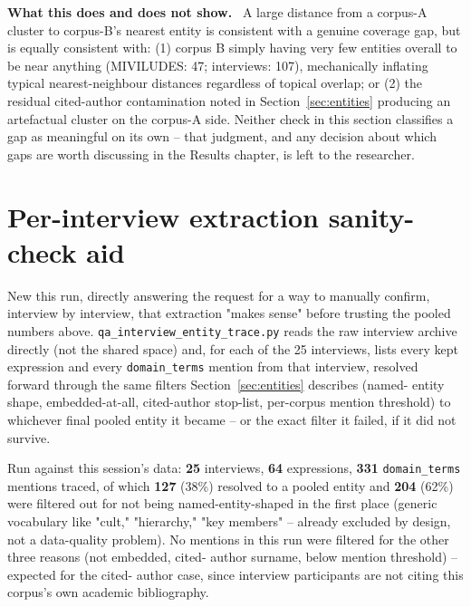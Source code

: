 \documentclass[11pt,a4paper]{article}
\newenvironment{plainbox}[1][Note]
  {\par\vspace{6pt}\noindent{\color{noteline}\rule{\linewidth}{0.6pt}}\par\vspace{3pt}
   \noindent\small\textbf{#1.}\ \ignorespaces}
  {\par\vspace{3pt}\noindent{\color{noteline}\rule{\linewidth}{0.6pt}}\vspace{6pt}\par}
\begin{document}
\begin{plainbox}[What this does and does not show]
A large distance from a corpus-A cluster to corpus-B's nearest entity is
consistent with a genuine coverage gap, but is equally consistent with:
(1) corpus B simply having very few entities overall to be near
anything (MIVILUDES: 47; interviews: 107), mechanically inflating
typical nearest-neighbour distances regardless of topical overlap; or
(2) the residual cited-author contamination noted in
Section~\ref{sec:entities} producing an artefactual cluster on the
corpus-A side. Neither check in this section classifies a gap as
meaningful on its own -- that judgment, and any decision about which
gaps are worth discussing in the Results chapter, is left to the
researcher.
\end{plainbox}

\section{Per-interview extraction sanity-check aid}
\label{sec:qa-trace}

New this run, directly answering the request for a way to manually
confirm, interview by interview, that extraction "makes sense" before
trusting the pooled numbers above. \texttt{qa\_interview\_entity\_trace.py}
reads the raw interview archive directly (not the shared space) and, for
each of the 25 interviews, lists every kept expression and every
\texttt{domain\_terms} mention from that interview, resolved forward
through the same filters Section~\ref{sec:entities} describes (named-
entity shape, embedded-at-all, cited-author stop-list, per-corpus
mention threshold) to whichever final pooled entity it became -- or the
exact filter it failed, if it did not survive.

Run against this session's data: \textbf{25} interviews, \textbf{64}
expressions, \textbf{331} \texttt{domain\_terms} mentions traced, of
which \textbf{127} (38\%) resolved to a pooled entity and \textbf{204}
(62\%) were filtered out for not being named-entity-shaped in the first
place (generic vocabulary like "cult," "hierarchy," "key members" --
already excluded by design, not a data-quality problem). No mentions in
this run were filtered for the other three reasons (not embedded, cited-
author surname, below mention threshold) -- expected for the cited-
author case, since interview participants are not citing this corpus's
own academic bibliography.
\end{document}
